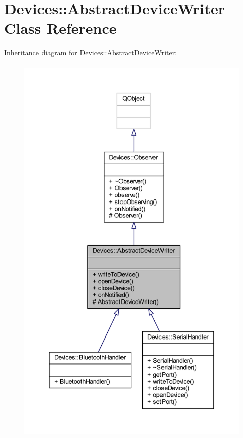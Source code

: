 \hypertarget{class_devices_1_1_abstract_device_writer}{}\section{Devices\+:\+:Abstract\+Device\+Writer Class Reference}
\label{class_devices_1_1_abstract_device_writer}


Inheritance diagram for Devices\+:\+:Abstract\+Device\+Writer\+:\nopagebreak
\begin{figure}[H]
\begin{center}
\leavevmode
\includegraphics[height=550pt]{d5/d98/class_devices_1_1_abstract_device_writer__inherit__graph}
\end{center}
\end{figure}


